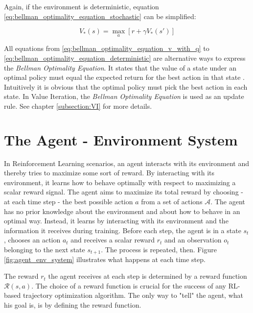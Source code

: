 Again, if the environment is deterministic, equation \ref{eq:bellman_optimality_equation_stochastic} can be simplified:

\begin{equation}
V_*(s) = \max_a[r+\gamma V_*(s')]
\label{eq:bellman_optimality_equation_deterministic}
\end{equation}

All equations from \ref{eq:bellman_optimality_equation_v_with_q} to \ref{eq:bellman_optimality_equation_deterministic} are alternative ways to express the \textit{Bellman Optimality Equation}. It states that the value of a state under an optimal policy must equal the expected return for the best action in that state \cite{SuttonBarto2018}. Intuitively it is obvious that the optimal policy must pick the best action in each state. In Value Iteration, the \textit{Bellman Optimality Equation} is used as an update rule. See chapter \ref{subsection:VI} for more details.

\section{The Agent - Environment System}

In Reinforcement Learning scenarios, an agent interacts with its environment and thereby tries to maximize some sort of reward. By interacting with its environment, it learns how to behave optimally with respect to maximizing a scalar reward signal. The agent aims to maximize its total reward by choosing - at each time step - the best possible action $a$ from a set of actions $\mathcal{A}$. 
The agent has no prior knowledge about the environment and about how to behave in an optimal way. Instead, it learns by interacting with its environment and the information it receives during training. Before each step, the agent is in a state $s_t$, chooses an action $a_t$ and receives a scalar reward $r_t$ and an observation $o_t$ belonging to the next state $s_{t+1}$. The process is repeated, then. Figure \ref{fig:agent_env_system} illustrates what happens at each time step.

The reward $r_t$ the agent receives at each step is determined by a reward function $\mathcal{R}(s,a)$. The choice of a reward function is crucial for the success of any RL-based trajectory optimization algorithm. The only way to "tell" the agent, what his goal is, is by defining the reward function. 

